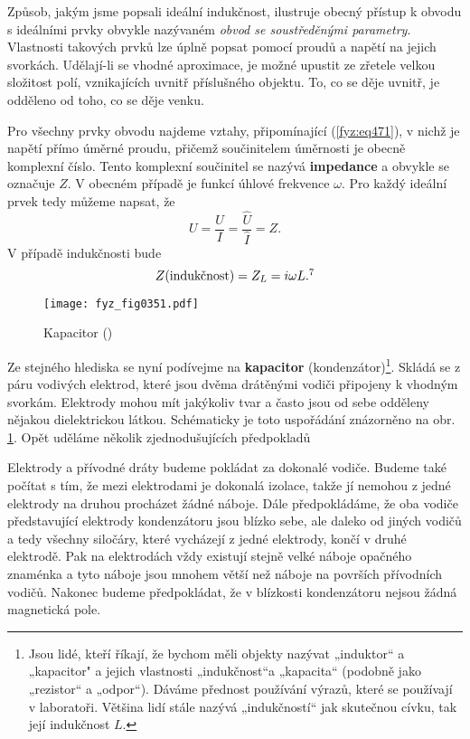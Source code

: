   Způsob, jakým jsme popsali ideální indukčnost, ilustruje obecný přístup k obvodu s ideálními 
  prvky obvykle nazývaném \emph{obvod se soustředěnými parametry}. Vlastnosti takových prvků lze 
  úplně popsat pomocí proudů a napětí na jejich svorkách. Udělají-li se vhodné aproximace, je možné 
  upustit ze zřetele velkou složitost polí, vznikajících uvnitř příslušného objektu. To, co se děje 
  uvnitř, je odděleno od toho, co se děje venku.
  
  Pro všechny prvky obvodu najdeme vztahy, připomínající (\ref{fyz:eq471}), v nichž je napětí přímo 
  úměrné proudu, přičemž součinitelem úměrnosti je obecně komplexní číslo. Tento komplexní 
  součinitel se nazývá \textbf{impedance} a obvykle se označuje \(Z\). V obecném případě je funkcí 
  úhlové frekvence \(\omega\). Pro každý ideální prvek tedy můžeme napsat, že
  \begin{equation}\label{fyz:eq472}
    U = \frac{U}{I} = \frac{\hat{U}}{\hat{I}} = Z.
  \end{equation}
  V případě indukčnosti bude
  \begin{equation}\label{fyz:eq473}
    Z(\text{indukčnost}) = Z_L = i\omega L.\footnotemark[7]
  \end{equation}

  
  \begin{figure}[ht!] %
    \centering
    \texttt{[image: fyz\_fig0351.pdf]}
    \caption{Kapacitor
             (\cite[s.~392]{Feynman02})}
    \label{fyz:fig0351}
  \end{figure}

  Ze stejného hlediska se nyní podívejme na \textbf{kapacitor} (kondenzátor)\footnote{Jsou lidé, 
  kteří říkají, že bychom měli objekty nazývat „induktor“ a „kapacitor" a jejich vlastnosti 
  „indukčnost“a „kapacita“ (podobně jako „rezistor“ a „odpor“). Dáváme přednost používání výrazů, 
  které se používají v laboratoři. Většina lidí stále nazývá „indukčností“ jak skutečnou cívku, tak 
  její indukčnost \(L\).}. Skládá se z páru vodivých elektrod, které jsou dvěma drátěnými vodiči 
  připojeny k vhodným svorkám. Elektrody mohou mít jakýkoliv tvar a často jsou od sebe odděleny 
  nějakou dielektrickou látkou. Schématicky je toto uspořádání znázorněno na obr. \ref{fyz:fig0351}. 
  Opět uděláme několik zjednodušujících předpokladů

  Elektrody a přívodné dráty budeme pokládat za dokonalé vodiče. Budeme také počítat s tím, že mezi 
  elektrodami je dokonalá izolace, takže jí nemohou z jedné elektrody na druhou procházet žádné 
  náboje. Dále předpokládáme, že oba vodiče představující elektrody kondenzátoru jsou blízko sebe, 
  ale daleko od jiných vodičů a tedy všechny siločáry, které vycházejí z jedné elektrody, končí v 
  druhé elektrodě. Pak na elektrodách vždy existují stejně velké náboje opačného znaménka a tyto 
  náboje jsou mnohem větší než náboje na površích přívodních vodičů. Nakonec budeme předpokládat, 
  že v blízkosti kondenzátoru nejsou žádná magnetická pole. 
  

